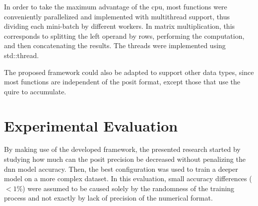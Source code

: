 \documentclass{article}
\begin{document}
	In order to take the maximum advantage of the \acrshort{cpu}, most functions were conveniently parallelized and implemented with multithread support, thus dividing each mini-batch by different workers. In matrix multiplication, this corresponds to splitting the left operand by rows, performing the computation, and then concatenating the results. The threads were implemented using std::thread.
	
	The proposed framework could also be adapted to support other data types, since most functions are independent of the posit format, except those that use the quire to accumulate.
	
	
	
	\vspace{-0.5\baselineskip}
	\section{Experimental Evaluation}
	\vspace{-0.5\baselineskip}
	
	By making use of the developed framework, the presented research started by studying how much can the posit precision be decreased without penalizing the \gls{dnn} model accuracy. Then, the best configuration was used to train a deeper model on a more complex dataset. In this evaluation, small accuracy differences ($<1\%$) were assumed to be caused solely by the randomness of the training process and not exactly by lack of precision of the numerical format.
	
\end{document}
